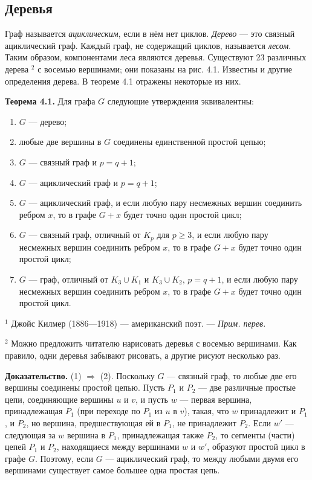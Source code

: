 \subsection{Деревья}

Граф называется \textit{ациклическим}, если в нём нет циклов. \textit{Дерево} — это связный ациклический граф. Каждый граф, не содержащий циклов, называется \textit{лесом}. Таким образом, компонентами леса являются деревья. Существуют 23 различных дерева \( ^2 \) с восемью вершинами; они показаны на рис. 4.1. Известны и другие определения дерева. В теореме 4.1 отражены некоторые из них.

\textbf{Теорема 4.1.} Для графа \( G \) следующие утверждения эквивалентны:
\begin{enumerate}
    \item \( G \) — дерево;
    \item любые две вершины в \( G \) соединены единственной простой цепью;
    \item \( G \) — связный граф и \( p = q + 1 \);
    \item \( G \) — ациклический граф и \( p = q + 1 \);
    \item \( G \) — ациклический граф, и если любую пару несмежных вершин соединить ребром \( x \), то в графе \( G + x \) будет точно один простой цикл;
    \item \( G \) — связный граф, отличный от \( K_p \) для \( p \geq 3 \), и если любую пару несмежных вершин соединить ребром \( x \), то в графе \( G + x \) будет точно один простой цикл;
    \item \( G \) — граф, отличный от \( K_3 \cup K_1 \) и \( K_3 \cup K_2 \), \( p = q + 1 \), и если любую пару несмежных вершин соединить ребром \( x \), то в графе \( G + x \) будет точно один простой цикл.
\end{enumerate}

\(^1\) Джойс Килмер (1886—1918) — американский поэт. — \textit{Прим. перев.}

\(^2\) Можно предложить читателю нарисовать деревья с восемью вершинами. Как правило, одни деревья забывают рисовать, а другие рисуют несколько раз.

\textbf{Доказательство.} (1) \(\Rightarrow\) (2). Поскольку \( G \) — связный граф, то любые две его вершины соединены простой цепью. Пусть \( P_1 \) и \( P_2 \) — две различные простые цепи, соединяющие вершины \( u \) и \( v \), и пусть \( w \) — первая вершина, принадлежащая \( P_1 \) (при переходе по \( P_1 \) из \( u \) в \( v \)), такая, что \( w \) принадлежит и \( P_1 \), и \( P_2 \), но вершина, предшествующая ей в \( P_1 \), не принадлежит \( P_2 \). Если \( w' \) — следующая за \( w \) вершина в \( P_1 \), принадлежащая также \( P_2 \), то сегменты (части) цепей \( P_1 \) и \( P_2 \), находящиеся между вершинами \( w \) и \( w' \), образуют простой цикл в графе \( G \). Поэтому, если \( G \) — ациклический граф, то между любыми двумя его вершинами существует самое большее одна простая цепь.

